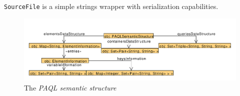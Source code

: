 \documentclass[10pt]{article}  %
\begin{document}
    \texttt{SourceFile} is a simple strings wrapper with serialization capabilities.
    \begin{figure}[htbp]
        \centering
        \includegraphics[scale=0.45]{semanticStructure.pdf}
        \caption{The \emph{PAQL semantic structure}}\label{fig:semanticStructure}
    \end{figure}
\end{document}
